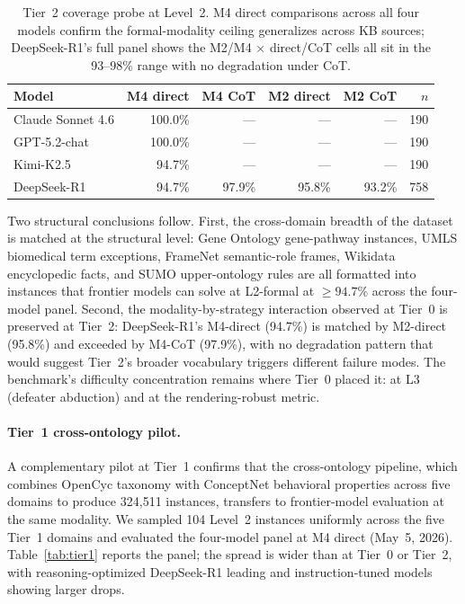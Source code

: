\documentclass{article}
\theoremstyle{definition}
\begin{document}
\begin{table}[h]
\centering
\caption{Tier~2 coverage probe at Level~2. M4 direct comparisons across all four models confirm the formal-modality ceiling generalizes across KB sources; DeepSeek-R1's full panel shows the M2/M4 $\times$ direct/CoT cells all sit in the 93--98\% range with no degradation under CoT.}
\label{tab:tier2}
\small
\begin{tabular}{lrrrr|r}
\toprule
\textbf{Model} & M4 direct & M4 CoT & M2 direct & M2 CoT & $n$ \\
\midrule
Claude Sonnet 4.6  & 100.0\% & --- & --- & --- & 190 \\
GPT-5.2-chat       & 100.0\% & --- & --- & --- & 190 \\
Kimi-K2.5          & \phantom{0}94.7\% & --- & --- & --- & 190 \\
DeepSeek-R1        & \phantom{0}94.7\% & 97.9\% & 95.8\% & 93.2\% & 758 \\
\bottomrule
\end{tabular}
\end{table}

Two structural conclusions follow. First, the cross-domain breadth of the dataset is matched at the structural level: Gene Ontology gene-pathway instances, UMLS biomedical term exceptions, FrameNet semantic-role frames, Wikidata encyclopedic facts, and SUMO upper-ontology rules are all formatted into instances that frontier models can solve at L2-formal at $\geq 94.7\%$ across the four-model panel. Second, the modality-by-strategy interaction observed at Tier~0 is preserved at Tier~2: DeepSeek-R1's M4-direct (94.7\%) is matched by M2-direct (95.8\%) and exceeded by M4-CoT (97.9\%), with no degradation pattern that would suggest Tier~2's broader vocabulary triggers different failure modes. The benchmark's difficulty concentration remains where Tier~0 placed it: at L3 (defeater abduction) and at the rendering-robust metric.

\paragraph{Tier~1 cross-ontology pilot.}
A complementary pilot at Tier~1 confirms that the cross-ontology pipeline, which combines OpenCyc taxonomy with ConceptNet behavioral properties across five domains to produce 324{,}511 instances, transfers to frontier-model evaluation at the same modality. We sampled 104 Level~2 instances uniformly across the five Tier~1 domains and evaluated the four-model panel at M4 direct (May~5, 2026). Table~\ref{tab:tier1} reports the panel; the spread is wider than at Tier~0 or Tier~2, with reasoning-optimized DeepSeek-R1 leading and instruction-tuned models showing larger drops.
\end{document}
